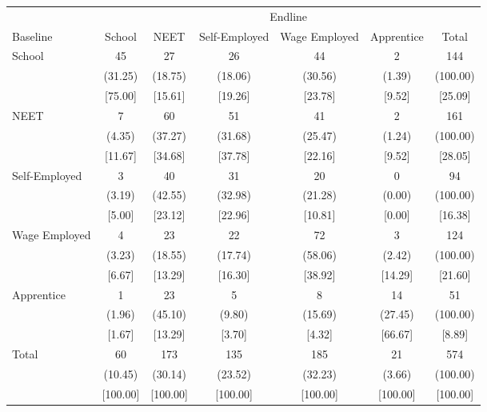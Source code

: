 {
\def\sym#1{\ifmmode^{#1}\else\(^{#1}\)\fi}
\begin{tabular}{l*{6}{c}}
\hline\hline
            &\multicolumn{6}{c}{Endline}                                                  \\
Baseline    &      School&        NEET&Self-Employed&Wage Employed&  Apprentice&       Total\\
\hline
School      &          45&          27&          26&          44&           2&         144\\
            &     (31.25)&     (18.75)&     (18.06)&     (30.56)&      (1.39)&    (100.00)\\
            &     [75.00]&     [15.61]&     [19.26]&     [23.78]&      [9.52]&     [25.09]\\
NEET        &           7&          60&          51&          41&           2&         161\\
            &      (4.35)&     (37.27)&     (31.68)&     (25.47)&      (1.24)&    (100.00)\\
            &     [11.67]&     [34.68]&     [37.78]&     [22.16]&      [9.52]&     [28.05]\\
Self-Employed&           3&          40&          31&          20&           0&          94\\
            &      (3.19)&     (42.55)&     (32.98)&     (21.28)&      (0.00)&    (100.00)\\
            &      [5.00]&     [23.12]&     [22.96]&     [10.81]&      [0.00]&     [16.38]\\
Wage Employed&           4&          23&          22&          72&           3&         124\\
            &      (3.23)&     (18.55)&     (17.74)&     (58.06)&      (2.42)&    (100.00)\\
            &      [6.67]&     [13.29]&     [16.30]&     [38.92]&     [14.29]&     [21.60]\\
Apprentice  &           1&          23&           5&           8&          14&          51\\
            &      (1.96)&     (45.10)&      (9.80)&     (15.69)&     (27.45)&    (100.00)\\
            &      [1.67]&     [13.29]&      [3.70]&      [4.32]&     [66.67]&      [8.89]\\
Total       &          60&         173&         135&         185&          21&         574\\
            &     (10.45)&     (30.14)&     (23.52)&     (32.23)&      (3.66)&    (100.00)\\
            &    [100.00]&    [100.00]&    [100.00]&    [100.00]&    [100.00]&    [100.00]\\
\hline\hline
\end{tabular}
}
